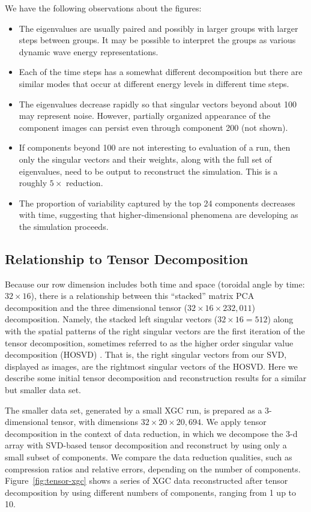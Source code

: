 We have the following observations about the figures:
\begin{itemize}
\item The eigenvalues are usually paired and possibly in larger groups
  with larger steps between groups. It may be possible to interpret
  the groups as various dynamic wave energy representations.
\item Each of the time steps has a somewhat different decomposition
  but there are similar modes that occur at different energy levels in
  different time steps.
\item The eigenvalues decrease rapidly so that singular vectors beyond
  about 100 may represent noise. However, partially organized
  appearance of the component images can persist even through
  component 200 (not shown).
\item If components beyond 100 are not interesting to evaluation of a
  run, then only the singular vectors and their weights, along with
  the full set of eigenvalues, need to be output to reconstruct the
  simulation. This is a roughly $5\times$ reduction.
\item The proportion of variability captured by the top 24 components
  decreases with time, suggesting that higher-dimensional phenomena
  are developing as the simulation proceeds.
\end{itemize}

\subsection{Relationship to Tensor Decomposition}
Because our row dimension includes both time and space (toroidal angle
by time: $32\times 16$), there is a relationship between this
``stacked'' matrix PCA decomposition and the three dimensional tensor
($32\times 16\times 232,011$) decomposition. Namely, the stacked left
singular vectors ($32\times 16 = 512$) along with the spatial patterns
of the right singular vectors are the first iteration of the tensor
decomposition, sometimes referred to as the higher order singular
value decomposition (HOSVD) \cite[p.1264]{DeLathauwer2000}. That is,
the right singular vectors from our SVD, displayed as images, are the
rightmost singular vectors of the HOSVD. Here we describe some initial
tensor decomposition and reconstruction results for a similar but
smaller data set.

The smaller data set, generated by a small XGC run, is
prepared as a 3-dimensional tensor, with dimensions
$32\times20\times20,694$. We apply tensor decomposition in the context
of data reduction, in which we decompose the 3-d array with SVD-based
tensor decomposition and reconstruct by using only a small subset of
components. We compare the data reduction qualities, such as
compression ratios and relative errors, depending on the number of
components. Figure~\ref{fig:tensor-xgc} shows a series of XGC data
reconstructed after tensor decomposition by using different numbers of
components, ranging from 1 up to 10.

